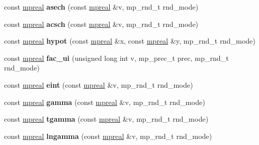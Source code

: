 \begin{DoxyCompactItemize}
const \hyperlink{classmpfr_1_1mpreal}{mpreal} {\bfseries asech} (const \hyperlink{classmpfr_1_1mpreal}{mpreal} \&v, mp\+\_\+rnd\+\_\+t rnd\+\_\+mode)
\item 
\mbox{\label{classmpfr_1_1mpreal_ad735a6effc0eb40d2038ef80551d4d16}} 
const \hyperlink{classmpfr_1_1mpreal}{mpreal} {\bfseries acsch} (const \hyperlink{classmpfr_1_1mpreal}{mpreal} \&v, mp\+\_\+rnd\+\_\+t rnd\+\_\+mode)
\item 
\mbox{\label{classmpfr_1_1mpreal_a7e7e7068e8b43b21dc9ec690de08b5d4}} 
const \hyperlink{classmpfr_1_1mpreal}{mpreal} {\bfseries hypot} (const \hyperlink{classmpfr_1_1mpreal}{mpreal} \&x, const \hyperlink{classmpfr_1_1mpreal}{mpreal} \&y, mp\+\_\+rnd\+\_\+t rnd\+\_\+mode)
\item 
\mbox{\label{classmpfr_1_1mpreal_a9e3b726154ad9628350de641fb11124d}} 
const \hyperlink{classmpfr_1_1mpreal}{mpreal} {\bfseries fac\+\_\+ui} (unsigned long int v, mp\+\_\+prec\+\_\+t prec, mp\+\_\+rnd\+\_\+t rnd\+\_\+mode)
\item 
\mbox{\label{classmpfr_1_1mpreal_a39102f5a371ae1643491e5d7dec13a81}} 
const \hyperlink{classmpfr_1_1mpreal}{mpreal} {\bfseries eint} (const \hyperlink{classmpfr_1_1mpreal}{mpreal} \&v, mp\+\_\+rnd\+\_\+t rnd\+\_\+mode)
\item 
\mbox{\label{classmpfr_1_1mpreal_adde0e2b6437e301a5774582f8b00ad39}} 
const \hyperlink{classmpfr_1_1mpreal}{mpreal} {\bfseries gamma} (const \hyperlink{classmpfr_1_1mpreal}{mpreal} \&v, mp\+\_\+rnd\+\_\+t rnd\+\_\+mode)
\item 
\mbox{\label{classmpfr_1_1mpreal_a4863b947198711044892196997f1e6f4}} 
const \hyperlink{classmpfr_1_1mpreal}{mpreal} {\bfseries tgamma} (const \hyperlink{classmpfr_1_1mpreal}{mpreal} \&v, mp\+\_\+rnd\+\_\+t rnd\+\_\+mode)
\item 
\mbox{\label{classmpfr_1_1mpreal_ada0178979f0f3dc3cb61401abb2e4496}} 
const \hyperlink{classmpfr_1_1mpreal}{mpreal} {\bfseries lngamma} (const \hyperlink{classmpfr_1_1mpreal}{mpreal} \&v, mp\+\_\+rnd\+\_\+t rnd\+\_\+mode)
\item 
\mbox{\label{classmpfr_1_1mpreal_a2076c489be59949d695f2b1a377e3516}} 

\end{DoxyCompactItemize}
